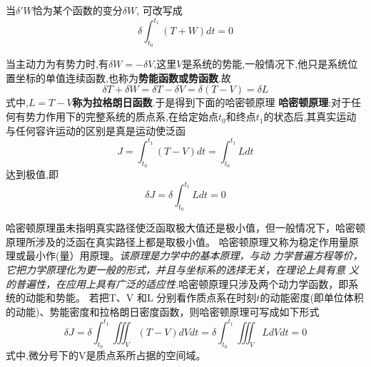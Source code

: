 \documentclass{article}
\begin{document}
当$\delta 'W$恰为某个函数的变分$\delta W$, \lasteq 可改写成
\begin{equation}
 \delta \int_{t_0}^{t_1}(T+W)dt=0
\end{equation}

当主动力为有势力时,有$\delta W=-\delta V$,这里$V$是系统的势能,一般情况下,他只是系统位置坐标的单值连续函数,也称为\textbf{势能函数或势函数}.故
\begin{equation}
 \delta T + \delta W =\delta T -\delta V =\delta (T-V)=\delta L
\end{equation}
式中,\textbf{$L=T-V$称为拉格朗日函数}.于是得到下面的哈密顿原理
\textbf{哈密顿原理}:对于任何有势力作用下的完整系统的质点系,在给定始点$t_0$和终点$t_1$的状态后,其真实运动与任何容许运动的区别是真是运动使泛函
\begin{equation}
 J=\int_{t_0}^{t_1}(T-V)dt=\int_{t_0}^{t_1}Ldt
\end{equation}
达到极值,即
\begin{equation}
 \delta J=\delta \int_{t_0}^{t_1}Ldt=0
\end{equation}

哈密顿原理虽未指明真实路径使泛函取极大值还是极小值，但一般情况下，哈密顿原理所涉及的泛函在真实路径上都是取极小值。
哈密顿原理又称为稳定作用量原理或最小作(量）用原理。\emph{该原理是力学中的基本原理，与动 力学普遍方程等价，它把力学原理化为更一般的形式，并且与坐标系的选择无关，在理论上具有意 义的普遍性，在应用上具有广泛的适应性.}哈密顿原理只涉及两个动力学函数，即系统的动能和势能。 若把T、V 和L 分别看作质点系在时刻$t$的动能密度(即单位体积的动能)、势能密度和拉格朗日密度函数，则哈密顿原理可写成如下形式
\begin{equation}
 \delta J=\delta \int_{t_0}^{t_1} \iiint_V (T-V)dVdt=\delta \int_{t_0}^{t_1} \iiint_V LdVdt =0
\end{equation}
式中,微分号下的V是质点系所占据的空间域。
\end{document}
